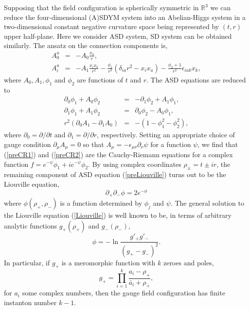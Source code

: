 \documentclass[a4paper,10pt]{article}
\begin{document}
Supposing that the field configuration is spherically symmetric in $\mathbb{R}^3$ we can reduce the four-dimensional (A)SDYM system into an Abelian-Higgs system in a two-dimensional constant negative curvature space being represented by $(t,r)$ upper half-plane.
Here we consider ASD system, SD system can be obtained similarly.
The ansatz on the connection components is,
\begin{eqnarray}
A^a_0&=&-A_0\frac{x_a}{r},\label{WA0}\\
A^a_i&=&-A_1\frac{x_ix_a}{r^2}-\frac{\phi_1}{r^3}(\delta_{ia}r^2-x_ix_a)-\frac{\phi_2+1}{r^2}\epsilon_{iak}x_k,\label{WA1}
\end{eqnarray}
where $A_0, A_1, \phi_1$ and $\phi_2$ are functions of $t$ and $r$.
The ASD equations are reduced to
\begin{eqnarray}
\partial_0\phi_1+A_0\phi_2&=&-\partial_1\phi_2+A_1\phi_1\label{preCR1},\\
\partial_1\phi_1+A_1\phi_2&=&\partial_0\phi_2-A_0\phi_1\label{preCR2},\\
r^2(\partial_0A_1-\partial_1A_0)&=&-(1-\phi_1^2-\phi_2^2)\label{preLiouville},
\end{eqnarray}
where $\partial_0=\partial/\partial t$ and $\partial_1=\partial/\partial r$, respectively.
Setting an appropriate choice of gauge condition $\partial_\mu A_\mu=0$ so that $A_\mu=-\epsilon_{\mu\nu}\partial_\nu\psi$ for a function $\psi$, we find that (\ref{preCR1}) and (\ref{preCR2}) are the Cauchy-Riemann equations for a complex function $f=e^{-\psi}\phi_1+ie^{-\psi}\phi_2$.
By using complex coordinates $\rho_\pm=t\pm ir$, the remaining component of ASD equation (\ref{preLiouville}) turns out to be the Liouville equation,
\begin{equation}
\partial_{+}\partial_{-}\phi=2e^{-\phi} \label{Liouville}
\end{equation}
where $\phi(\rho_+,\rho_-)$ is a function determined by $\phi_j$ and $\psi$.
The general solution to the Liouville equation (\ref{Liouville}) is well known to be, in terms of arbitrary analytic functions $g_+(\rho_+)$ and $g_-(\rho_-)$, 
\begin{equation}
\phi=-\ln \frac{g'_{+}g'_{-}}{(g_{+}-g_{-})^2}. \label{solLiouville}
\end{equation}
In particular, if $g_+$ is a meromorphic function with $k$ zeroes and poles,
\begin{equation}
g_+=\prod_{i=1}^k\frac{a_i-\rho_+}{\bar a_i+\rho_+}\label{meromfunc},
\end{equation}
for $a_i$ some complex numbers, then the gauge field configuration has finite instanton number $k-1$.
\end{document}
